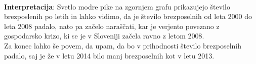 \documentclass[11pt,a4paper]{article}
\begin{document}
 \\

\textbf{Interpretacija}: Svetlo modre pike na zgornjem grafu prikazujejo število brezposlenih po letih in lahko vidimo, da je število brezposelnih od leta 2000 do leta 2008 padalo, nato pa začelo naraščati, kar je verjento povezano z gospodarsko krizo, ki se je v Sloveniji začela ravno z letom 2008.\\

Za konec lahko še povem, da upam, da bo v prihodnosti število brezposelnih padalo, saj je že v letu 2014 bilo manj brezposelnih kot v letu 2013.
\end{document}
